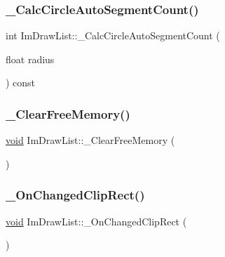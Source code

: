 \subsubsection{\texorpdfstring{\+\_\+\+Calc\+Circle\+Auto\+Segment\+Count()}{\_CalcCircleAutoSegmentCount()}}
{\footnotesize\ttfamily int Im\+Draw\+List\+::\+\_\+\+Calc\+Circle\+Auto\+Segment\+Count (\begin{DoxyParamCaption}\item[{float}]{radius }\end{DoxyParamCaption}) const}

\mbox{\label{structImDrawList_a61a886a16655c810e04c0ccebb228f9a}} 
\subsubsection{\texorpdfstring{\+\_\+\+Clear\+Free\+Memory()}{\_ClearFreeMemory()}}
{\footnotesize\ttfamily \hyperlink{imgui__impl__opengl3__loader_8h_ac668e7cffd9e2e9cfee428b9b2f34fa7}{void} Im\+Draw\+List\+::\+\_\+\+Clear\+Free\+Memory (\begin{DoxyParamCaption}{ }\end{DoxyParamCaption})}

\mbox{\label{structImDrawList_a8e51ddbe1f9732bc271ce807bec23f54}} 
\subsubsection{\texorpdfstring{\+\_\+\+On\+Changed\+Clip\+Rect()}{\_OnChangedClipRect()}}
{\footnotesize\ttfamily \hyperlink{imgui__impl__opengl3__loader_8h_ac668e7cffd9e2e9cfee428b9b2f34fa7}{void} Im\+Draw\+List\+::\+\_\+\+On\+Changed\+Clip\+Rect (\begin{DoxyParamCaption}{ }\end{DoxyParamCaption})}

\mbox{\label{structImDrawList_a7c14ae666a0df75214ecb97cdb9bd8f4}} 
